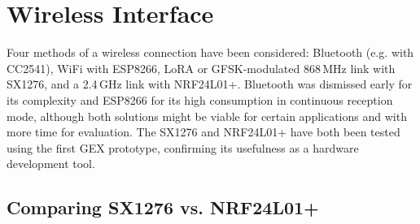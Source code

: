 \chapter{Wireless Interface}

Four methods of a wireless connection have been considered: Bluetooth (e.g. with CC2541), WiFi with ESP8266, LoRA or GFSK-modulated 868\,MHz link with SX1276, and a 2.4\,GHz link with NRF24L01+. Bluetooth was dismissed early for its complexity and ESP8266 for its high consumption in continuous reception mode, although both solutions might be viable for certain applications and with more time for evaluation. The SX1276 and NRF24L01+ have both been tested using the first GEX prototype, confirming its usefulness as a hardware development tool.

\section{Comparing SX1276 vs. NRF24L01+}




































